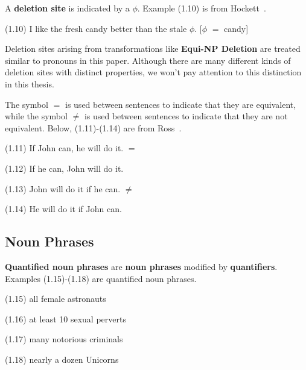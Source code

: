 \documentclass{article}
\begin{document}
A \textbf{deletion site} is indicated by a \textbf{${\phi}$}. Example
(1.10) is from Hockett~\cite{Hockett58}.

\begin{enumerate*}
\item[(1.10)] I like the fresh candy better than the stale
${\phi}$. [${\phi}$ ${=}$ candy]
\end{enumerate*}

Deletion sites arising from transformations like
\textbf{Equi-NP Deletion} are treated similar to pronouns in
this paper. Although there are many different kinds of deletion
sites with distinct properties, we won't pay attention to this
distinction in this thesis.

The symbol ${\bm{=}}$ is used between sentences to indicate that
they are equivalent, while the symbol ${\bm{\ne}}$ is used
between sentences to indicate that they are not equivalent.
Below, (1.11)-(1.14) are from Ross~\cite{Ross67}.

\begin{enumerate*}
\item[(1.11)] If John can, he will do it. ${=}$
\item[(1.12)] If he can, John will do it.
\item[(1.13)] John will do it if he can. ${\ne}$
\item[(1.14)] He will do it if John can.
\end{enumerate*}


\subsection{Noun Phrases}

\textbf{Quantified noun phrases} are \textbf{noun phrases} modified by
\textbf{quantifiers}. Examples (1.15)-(1.18) are quantified noun
phrases.

\begin{enumerate*}
\item[(1.15)] all female astronauts
\item[(1.16)] at least 10 sexual perverts
\item[(1.17)] many notorious criminals
\item[(1.18)] nearly a dozen Unicorns
\end{enumerate*}
\end{document}
